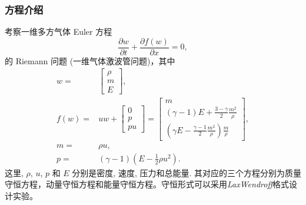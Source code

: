 \documentclass[10.5pt
]{article}
\begin{document}
\subsubsection{方程介绍}
考察一维多方气体 Euler 方程
\begin{equation}
\frac{\partial w}{\partial t} + \frac{\partial f(w)}{\partial
x}= 0\label{Eqn:Euler},
\end{equation}
的 Riemann 问题 (一维气体激波管问题)，其中
\begin{align}
w =& \left[\begin{array}{c}
\rho\\
m\\
E
\end{array}\right],
\\
f(w) =& u w + \left[\begin{array}{c}
0\\
p\\
p u
\end{array}\right] = \left[\begin{array}{c}
m
\\
(\gamma - 1) E + \frac{3 - \gamma}{2} \frac{m^2}{\rho}
\\
(\gamma E - \frac{\gamma - 1}{2} \frac{m^2}{\rho}) \frac{m}{\rho}
\end{array}\right],
\\
m =& \rho u,
\\
p =& (\gamma - 1)(E - \frac{1}{2} \rho u^2).
\end{align}
这里, $\rho$, $u$, $p$ 和 $E$ 分别是密度, 速度, 压力和总能量. 其对应的三个方程分别为质量守恒方程，动量守恒方程和能量守恒方程。守恒形式可以采用\textit{LaxWendroff}格式设计实验。
\end{document}
